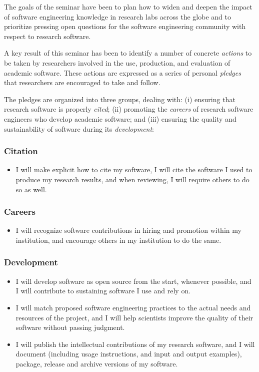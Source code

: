 \documentclass[a4paper,UKenglish]{dagman}
\renewcommand{\paragraph}[1]{\subsubsection*{#1}\xspace}
\begin{document}
The goals of the seminar have been to plan how to widen and deepen the impact of software engineering knowledge in research labs across the globe and to prioritize pressing open questions for the software engineering community with respect to research software.

A key result of this seminar has been to identify a number of concrete \emph{actions} to be taken by researchers involved in the use, production, and evaluation of academic software. These actions are expressed as a series of personal \emph{pledges} that researchers are encouraged to take and follow.

The pledges are organized into three groups, dealing with:
(i) ensuring that research software is properly \emph{cited};
(ii) promoting the \emph{careers} of research software engineers who develop academic software;
and
(iii) ensuring the quality and sustainability of software during its \emph{development}:

\paragraph{Citation}
\begin{itemize}
\item I will make explicit how to cite my software, I will cite the software I used to produce my research results, and when reviewing, I will require others to do so as well.
\end{itemize}

\paragraph{Careers}
\begin{itemize}
\item I will recognize software contributions in hiring and promotion within my institution, and encourage others in my institution to do the same.
\end{itemize}

\paragraph{Development}
\begin{itemize}
\item I will develop software as open source from the start, whenever possible, and I will contribute to sustaining software I use and rely on.
\item I will match proposed software engineering practices to the actual needs and resources of the project, and I will help scientists improve the quality of their software without passing judgment.
\item I will publish the intellectual contributions of my research software, and I will document (including usage instructions, and input and output examples), package, release and archive versions of my software.
\end{itemize}
\end{document}
